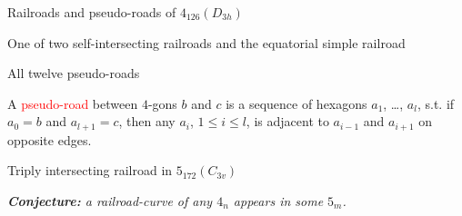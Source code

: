 \documentclass[%
pdf,
colorBG,
slideColor,
]{prosper}
\begin{document}
\begin{slide}{Railroads and pseudo-roads of $4_{126}(D_{3h})$}

\begin{center}
\begin{minipage}[b]{5.7cm}%
\centering
{}\par
{\scriptsize One of two self-intersecting railroads and the equatorial simple railroad}
\end{minipage}
\begin{minipage}[b]{5.5cm}%
\centering
{}\par
{\scriptsize All twelve pseudo-roads}
\end{minipage}
\end{center}
A \textcolor{red}{pseudo-road} between $4$-gons $b$ and $c$ is a sequence of
hexagons $a_1$, \dots, $a_l$,
s.t. if $a_0=b$ and $a_{l+1}=c$, then any $a_i$,
$1\leq i\leq l$, is adjacent to $a_{i-1}$ and $a_{i+1}$ on
opposite edges.


\end{slide}


\begin{slide}{Triply intersecting railroad in $5_{172}(C_{3v})$}
\begin{center}
\end{center}

\vspace{3mm}

{\em {\bf Conjecture: }
a railroad-curve of any $4_n$ appears in some $5_m$.
}


\end{slide}
\end{document}
